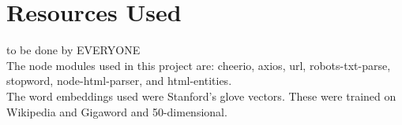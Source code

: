 \section{Resources Used}
to be done by EVERYONE\\
The node modules used in this project are: cheerio, axios, url, robots-txt-parse, stopword, node-html-parser, and html-entities.\\
The word embeddings used were Stanford's glove vectors. These were trained on Wikipedia and Gigaword and 50-dimensional.


